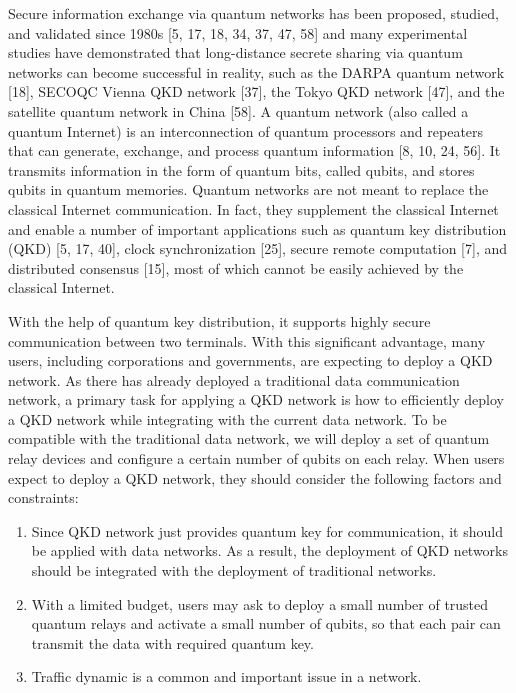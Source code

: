 
Secure information exchange via quantum networks has been proposed, studied, and validated since 1980s [5, 17, 18, 34, 37, 47, 58] and many experimental studies have demonstrated that long-distance secrete sharing via quantum networks can become successful in reality, such as the DARPA quantum network [18], SECOQC Vienna QKD network [37], the Tokyo QKD network [47], and the satellite quantum network in China [58]. A quantum network (also called a quantum Internet) is an interconnection of quantum processors and repeaters that can generate, exchange, and process quantum information [8, 10, 24, 56]. It transmits information in the
form of quantum bits, called qubits, and stores qubits in quantum memories. Quantum networks are not meant to replace the classical Internet communication. In fact, they supplement the classical Internet and enable a number of important applications such as quantum key distribution (QKD) [5, 17, 40], clock synchronization [25], secure remote computation [7], and distributed consensus [15], most of which cannot be easily achieved by the classical Internet.


With the help of quantum key distribution, it supports highly secure communication between two terminals. With this significant advantage, many users, including corporations and governments, are expecting to deploy a QKD network. As there has already deployed a traditional data communication network, a primary task for applying a QKD network is how to efficiently deploy a QKD network while integrating with the current data network. To be compatible with the traditional data network, we will deploy a set of quantum relay devices and configure a certain number of qubits on each relay. When users expect to deploy a QKD network, they should consider the following factors and constraints:
\begin{enumerate}
\item Since QKD network just provides quantum key for communication, it should be applied with data networks. As a result, the deployment of QKD networks should be integrated with the deployment of traditional networks.
\item With a limited budget, users may ask to deploy a small number of trusted quantum relays and activate a small number of qubits, so that each pair can transmit the data with required quantum key.
\item Traffic dynamic is a common and important issue in a network.     
\end{enumerate} 

